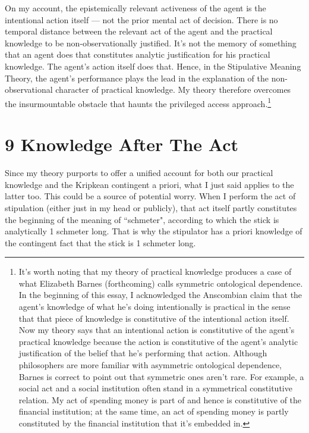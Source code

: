 \documentclass[a4paper,12pt]{article}
\begin{document}
On my account, the epistemically relevant activeness of the agent is the intentional action itself --- not the prior mental act of decision. There is no temporal distance between the relevant act of the agent and the practical knowledge to be non-observationally justified. It's not the memory of something that an agent does that constitutes analytic justification for his practical knowledge. The agent's action itself does that. Hence, in the Stipulative Meaning Theory, the agent's performance plays the lead in the explanation of the non-observational character of practical knowledge. My theory therefore overcomes the insurmountable obstacle that haunts the privileged access approach.\footnote{It's worth noting that my theory of practical knowledge produces a case of what Elizabeth Barnes (forthcoming) calls symmetric ontological dependence. In the beginning of this essay, I acknowledged the Anscombian claim that the agent's knowledge of what he's doing intentionally is practical in the sense that that piece of knowledge is constitutive of the intentional action itself. Now my theory says that an intentional action is constitutive of the agent's practical knowledge because the action is constitutive of the agent's analytic justification of the belief that he's performing that action. Although philosophers are more familiar with asymmetric ontological dependence, Barnes is correct to point out that symmetric ones aren't rare. For example, a social act and a social institution often stand in a symmetrical constitutive relation. My act of spending money is part of and hence is constitutive of the financial institution; at the same time, an act of spending money is partly constituted by the financial institution that it's embedded in.}

\section*{9 Knowledge After The Act}

Since my theory purports to offer a unified account for both our practical knowledge and the Kripkean contingent a priori, what I just said applies to the latter too. This could be a source of potential worry. When I perform the act of stipulation (either just in my head or publicly), that act itself partly constitutes the beginning of the meaning of ``schmeter", according to which the stick is analytically 1 schmeter long. That is why the stipulator has a priori knowledge of the contingent fact that the stick is 1 schmeter long.
\end{document}
